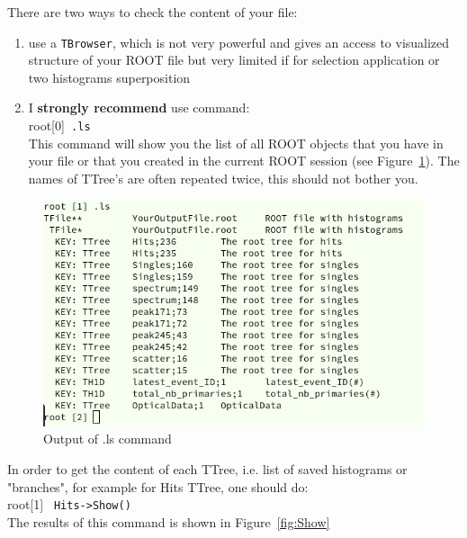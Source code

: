 \documentclass[12pt]{article}
\begin{document}
There are two ways to check the content of your file:
\begin{enumerate}
\item use a \verb|TBrowser|, which is not very powerful and gives an access to visualized structure of your ROOT file but very limited if for selection application or two histograms superposition
\item I \textbf{strongly recommend} use command:\\

root[0]\verb| .ls|\\

This command will show you the list of all ROOT objects that you have in your file or that you created in the current ROOT session (see Figure~\ref{fig:.ls}). The names of TTree's are often repeated twice, this should not bother you. 
\end{enumerate}
\begin{figure}[h]
\centering
\includegraphics[scale=0.5]{figs/ls.png}
\caption{Output of .ls command}
\label{fig:.ls}
\end{figure}
\clearpage
In order to get the content of each TTree, i.e. list of saved histograms
or "branches", for example for Hits TTree, one should do:\\

root[1] \verb| Hits->Show()| \\

The results of this command is shown in Figure~\ref{fig:Show}
\end{document}
